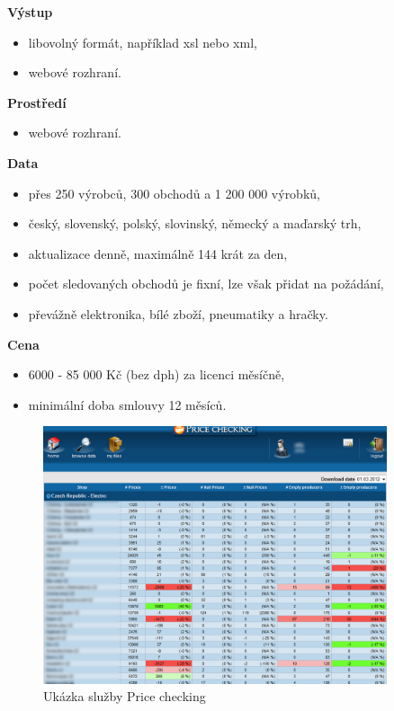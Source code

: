 \documentclass[thesis=B,czech]{FITthesis}[2012/06/26]
\begin{document}
\textbf{Výstup}
\begin{itemize}
\item libovolný formát, například xsl nebo xml,
\item webové rozhraní.
\end{itemize}

\textbf{Prostředí}
\begin{itemize}
\item webové rozhraní.
\end{itemize}

\textbf{Data}
\begin{itemize}
\item přes 250 výrobců, 300 obchodů a 1 200 000 výrobků,
\item český, slovenský, polský, slovinský, německý a maďarský trh,
\item aktualizace denně, maximálně 144 krát za den,
\item počet sledovaných obchodů je fixní, lze však přidat na požádání,
\item převážně elektronika, bílé zboží, pneumatiky a hračky.
\end{itemize}

\textbf{Cena}
\begin{itemize}
\item 6000 - 85 000 Kč (bez dph) za licenci měsíčně,
\item minimální doba smlouvy 12 měsíců.
\end{itemize}

\begin{figure}[h]\centering
 	\includegraphics[width=0.9\textwidth]{resources/priceChecking}
	\caption[Price checking]{Ukázka služby Price checking}\label{fig:priceChecking}
\end{figure}
\end{document}
